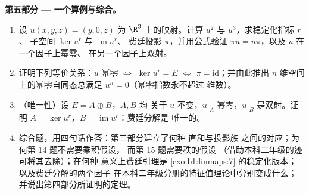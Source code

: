 \begin{problem}
\medskip
\noindent\textbf{第五部分 --- 一个算例与综合。}
\begin{enumerate}[resume]
  \item 设 $u(x, y, z) = (y, 0, z)$ 为 $\R^3$ 上的映射。计算 $u^2$ 与
        $u^3$，求稳定化指标 $r$、
        子空间 $\ker u^{r}$ 与 $\operatorname{im} u^{r}$、
        费廷投影 $\pi$，并用公式验证
        $\pi u = u\pi$，以及 $u$ 在一个因子上幂零、
        在另一个因子上双射。
  \item 证明下列等价关系：$u$ 幂零 $\iff$ $\ker u^{r} =
        E$ $\iff$ $\pi = \mathrm{id}$；并由此推出
        $n$ 维空间上的幂零自同态总满足
        $u^{n} = 0$（幂零指数永不超过
        维数）。
  \item （唯一性）设 $E = A \oplus B$，$A, B$ 均
        关于 $u$ 不变，$u|_A$ 幂零，$u|_B$
        是双射。证明 $A = \ker u^{r}$，$B =
        \operatorname{im} u^{r}$：费廷分解是
        唯一的。
  \item 综合题，用四句话作答：第三部分建立了何种
        直和与投影族
        之间的对应；为何第 14 题不需要乘积假设，
        而第 15 题需要秩的假设
        （借助本科二年级的迹可将其去除）；在何种
        意义上费廷引理是
        \cref{exo:b1:linmaps:7} 的稳定化版本；以及费廷分解的两个因子
        在本科二年级分册的特征值理论中分别变成什么；
        并说出第四部分所证明的定理。
\end{enumerate}
\end{problem}
